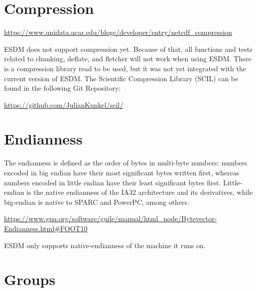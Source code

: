 \section{Compression}

\tab

\url{https://www.unidata.ucar.edu/blogs/developer/entry/netcdf_compression}

ESDM does not support compression yet. Because of that, all functions and tests related to chunking, deflate, and fletcher will not work when using ESDM. There is a compression library read to be used, but it was not yet integrated with the current version of ESDM. The Scientific Compression Library (SCIL) can be found in the following Git Repository:

\begin{center}
\url{https://github.com/JulianKunkel/scil/}
\end{center}

\section{Endianness}

\tab
\begin{framed}

The endianness is defined as the order of bytes in multi-byte numbers: numbers encoded in big endian have their most significant bytes written first, whereas numbers encoded in little endian have their least significant bytes first. Little-endian is the native endianness of the IA32 architecture and its derivatives, while big-endian is native to SPARC and PowerPC, among others.

\url{https://www.gnu.org/software/guile/manual/html_node/Bytevector-Endianness.html#FOOT10}

\end{framed}

ESDM only supports native-endianness of the machine it runs on.

\section{Groups}

